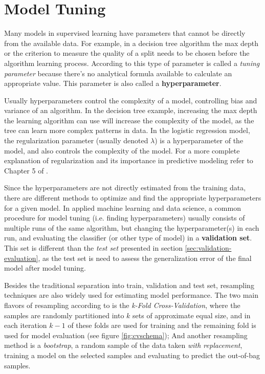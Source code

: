 \section{Model Tuning}

Many models in supervised learning have parameters that cannot be directly from the available data. For example, in a decision tree algorithm the max depth or the criterion to measure the quality of a split needs to be chosen before the algorithm learning process. According to \cite{kuhn2013applied} this type of parameter is called a \textit{tuning parameter} because there's no analytical formula available to calculate an appropriate value. This parameter is also called a \textbf{hyperparameter}. 

Usually hyperparameters control the complexity of a model, controlling bias and variance of an algorithm. In the decision tree example, increasing the max depth the learning algorithm can use will increase the complexity of the model, as the tree can learn more complex patterns in data. In the logistic regression model, the regularization parameter (usually denoted $\lambda$) is a hyperparameter of the model, and also controls the complexity of the model. For a more complete explanation of regularization and its importance in predictive modeling refer to Chapter 5 of \cite{hastie2009elements}.

Since the hyperparameters are not directly estimated from the training data, there are different methods to optimize and find the appropriate hyperparameters for a given model. In applied machine learning and data science, a common procedure for model tuning (i.e. finding hyperparameters) usually consists of multiple runs of the same algorithm, but changing the hyperparameter(s) in each run, and evaluating the classifier (or other type of model) in a \textbf{validation set}. This set is different than the \textit{test set} presented in section \ref{sec:validation-evaluation}, as the test set is need to assess the generalization error of the final model after model tuning. 

Besides the traditional separation into train, validation and test set, resampling techniques are also widely used for estimating model performance. The two main flavors of resampling according to \cite{kuhn2013applied} is the \textit{k-Fold Cross-Validation}, where the samples are randomly partitioned into $k$ sets of approximate equal size, and in each iteration $k - 1$ of these folds are used for training and the remaining fold is used for model evaluation (see figure \ref{fig:cvschema}); And another resampling method is a \textit{bootstrap}, a random sample of the data taken \textit{with replacement}, training a model on the selected samples and evaluating to predict the out-of-bag samples.

